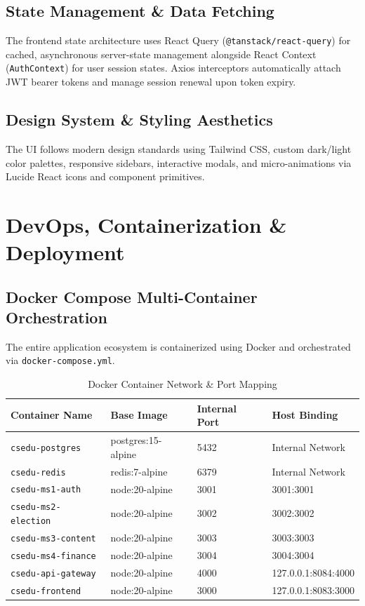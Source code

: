 \documentclass[12pt, a4paper]{report}
\begin{document}
\section{State Management \& Data Fetching}
The frontend state architecture uses React Query (\texttt{@tanstack/react-query}) for cached, asynchronous server-state management alongside React Context (\texttt{AuthContext}) for user session states. Axios interceptors automatically attach JWT bearer tokens and manage session renewal upon token expiry.

\section{Design System \& Styling Aesthetics}
The UI follows modern design standards using Tailwind CSS, custom dark/light color palettes, responsive sidebars, interactive modals, and micro-animations via Lucide React icons and component primitives.

\chapter{DevOps, Containerization \& Deployment}

\section{Docker Compose Multi-Container Orchestration}
The entire application ecosystem is containerized using Docker and orchestrated via \texttt{docker-compose.yml}.

\begin{table}[h!]
\centering
\caption{Docker Container Network \& Port Mapping}
\label{tab:docker_ports}
\begin{tabular}{@{}llll@{}}
\toprule
\textbf{Container Name} & \textbf{Base Image} & \textbf{Internal Port} & \textbf{Host Binding} \\ \midrule
\texttt{csedu-postgres} & postgres:15-alpine & 5432 & Internal Network \\
\texttt{csedu-redis} & redis:7-alpine & 6379 & Internal Network \\
\texttt{csedu-ms1-auth} & node:20-alpine & 3001 & 3001:3001 \\
\texttt{csedu-ms2-election} & node:20-alpine & 3002 & 3002:3002 \\
\texttt{csedu-ms3-content} & node:20-alpine & 3003 & 3003:3003 \\
\texttt{csedu-ms4-finance} & node:20-alpine & 3004 & 3004:3004 \\
\texttt{csedu-api-gateway} & node:20-alpine & 4000 & 127.0.0.1:8084:4000 \\
\texttt{csedu-frontend} & node:20-alpine & 3000 & 127.0.0.1:8083:3000 \\ \bottomrule
\end{tabular}
\end{table}
\end{document}
